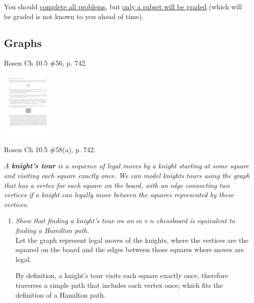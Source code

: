 \medskip
\noindent You should \underline{complete all problems}, but \underline{only a
subset will be graded} (which will be graded is not known to you ahead of
time).
\fi
\begin{questions}


\section*{Graphs}

 Rosen Ch 10.5 \#56, p. 742.
  \ifprintanswers
        \vspace{-10pt}
  \fi
  \begin{solution}
    \includegraphics[width=1in]{figs/rosen_10_5_56}
  \end{solution}


  \ifprintanswers
        \vspace{-10pt}
  \fi
{} Rosen Ch 10.5 \#58(a), p. 742.
  \ifprintanswers
        \vspace{-10pt}
  \fi
  \begin{solution}
  \textit{A \textbf{knight’s tour} is a sequence of legal moves by a knight starting at some square and visiting each square exactly once. We can model knights tours using the graph that has a vertex for each square on the board, with an edge connecting two vertices if a knight can legally move between the squares represented by these vertices.}

  \begin{enumerate}[label=(\alph*),itemsep=0pt,parsep=0pt,topsep=0pt,partopsep=0pt]
    \item \textit{Show that finding a knight’s tour on an $m \times n$ chessboard is equivalent to finding a Hamilton path.} \\
    Let the graph represent legal moves of the knights, where the vertices are the squared on the board and the edges between those squares where moves are legal. 

    By definition, a knight’s tour visits each square exactly once, therefore traverses a simple path that includes each vertex once; which fits the definition of a Hamilton path. 


\end{enumerate}
\end{solution}
\end{questions}
